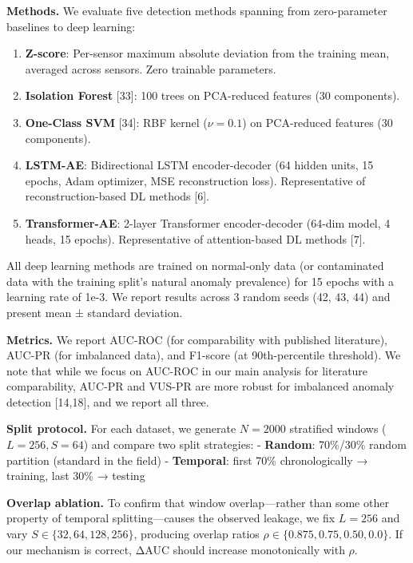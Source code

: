 \documentclass[
]{article}
\providecommand{\tightlist}{%
  \setlength{\itemsep}{0pt}\setlength{\parskip}{0pt}}
\begin{document}
\textbf{Methods.} We evaluate five detection methods spanning from
zero-parameter baselines to deep learning:

\begin{enumerate}
\def\labelenumi{\arabic{enumi}.}
\tightlist
\item
  \textbf{Z-score}: Per-sensor maximum absolute deviation from the
  training mean, averaged across sensors. Zero trainable parameters.
\item
  \textbf{Isolation Forest} {[}33{]}: 100 trees on PCA-reduced features
  (30 components).
\item
  \textbf{One-Class SVM} {[}34{]}: RBF kernel (\(\nu = 0.1\)) on
  PCA-reduced features (30 components).
\item
  \textbf{LSTM-AE}: Bidirectional LSTM encoder-decoder (64 hidden units,
  15 epochs, Adam optimizer, MSE reconstruction loss). Representative of
  reconstruction-based DL methods {[}6{]}.
\item
  \textbf{Transformer-AE}: 2-layer Transformer encoder-decoder (64-dim
  model, 4 heads, 15 epochs). Representative of attention-based DL
  methods {[}7{]}.
\end{enumerate}

All deep learning methods are trained on normal-only data (or
contaminated data with the training split's natural anomaly prevalence)
for 15 epochs with a learning rate of 1e-3. We report results across 3
random seeds (42, 43, 44) and present mean ± standard deviation.

\textbf{Metrics.} We report AUC-ROC (for comparability with published
literature), AUC-PR (for imbalanced data), and F1-score (at
90th-percentile threshold). We note that while we focus on AUC-ROC in
our main analysis for literature comparability, AUC-PR and VUS-PR are
more robust for imbalanced anomaly detection {[}14,18{]}, and we report
all three.

\textbf{Split protocol.} For each dataset, we generate \(N = 2000\)
stratified windows (\(L = 256, S = 64\)) and compare two split
strategies: - \textbf{Random}: 70\%/30\% random partition (standard in
the field) - \textbf{Temporal}: first 70\% chronologically → training,
last 30\% → testing

\textbf{Overlap ablation.} To confirm that window overlap---rather than
some other property of temporal splitting---causes the observed leakage,
we fix \(L = 256\) and vary \(S \in \{32, 64, 128, 256\}\), producing
overlap ratios \(\rho \in \{0.875, 0.75, 0.50, 0.0\}\). If our mechanism
is correct, ΔAUC should increase monotonically with \(\rho\).
\end{document}
